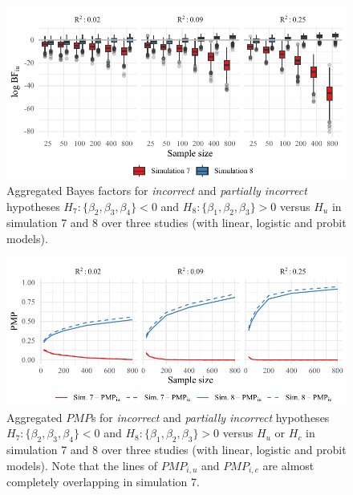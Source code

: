 \documentclass[
]{interact}
\begin{document}
\begin{figure}[!t]

{\centering \includegraphics[width=1\textwidth,height=\textheight]{manuscript_VK_files/figure-pdf/fig-BF78-1.pdf}

}

\caption{\label{fig-BF78}Aggregated Bayes factors for \textit{incorrect}
and \textit{partially incorrect} hypotheses
\(H_7: \{\beta_2, \beta_3, \beta_4\} < 0\) and
\(H_8: \{\beta_1, \beta_2, \beta_3\} > 0\) versus \(H_u\) in simulation
7 and 8 over three studies (with linear, logistic and probit models).}

\end{figure}

\begin{figure}[!t]

{\centering \includegraphics[width=1\textwidth,height=\textheight]{manuscript_VK_files/figure-pdf/fig-PMP78-1.pdf}

}

\caption{\label{fig-PMP78}Aggregated \(PMP\)s for \textit{incorrect} and
\textit{partially incorrect} hypotheses
\(H_7: \{\beta_2, \beta_3, \beta_4\} < 0\) and
\(H_8: \{\beta_1, \beta_2, \beta_3\} > 0\) versus \(H_u\) or \(H_c\) in
simulation 7 and 8 over three studies (with linear, logistic and probit
models). Note that the lines of \(PMP_{i,u}\) and \(PMP_{i,c}\) are
almost completely overlapping in simulation 7.}

\end{figure}
\end{document}
